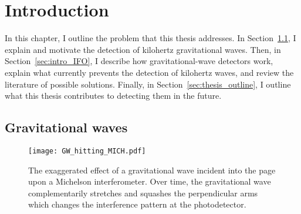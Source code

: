 \chapter{Introduction} %
\label{chp:introduction}





In this chapter, I outline the problem that this thesis addresses. In Section~\ref{sec:gravWaves}, I explain and motivate the detection of kilohertz gravitational waves. Then, in Section~\ref{sec:intro_IFO}, I describe how gravitational-wave detectors work, explain what currently prevents the detection of kilohertz waves, and review the literature of possible solutions. Finally, in Section~\ref{sec:thesis_outline}, I outline what this thesis contributes to detecting them in the future.


\section{Gravitational waves}
\label{sec:gravWaves}

\begin{figure}
	\centering
	\texttt{[image: GW\_hitting\_MICH.pdf]}
	\caption{The exaggerated effect of a gravitational wave incident into the page upon a Michelson interferometer. Over time, the gravitational wave complementarily stretches and squashes the perpendicular arms which changes the interference pattern at the photodetector.}
	\label{fig:GW_incident_Michelson}
\end{figure}

